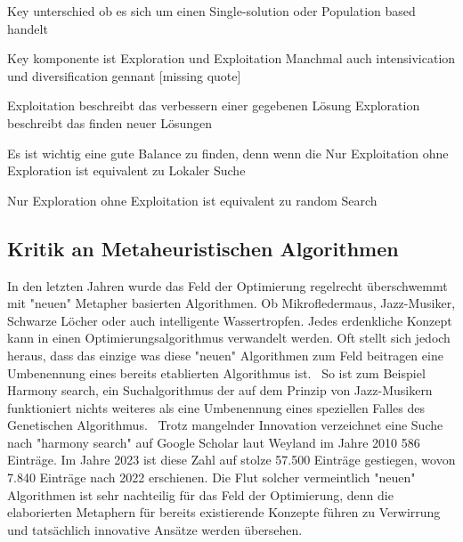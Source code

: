 Key unterschied ob es sich um einen Single-solution oder Population based handelt



Key komponente ist Exploration und Exploitation
Manchmal auch intensivication und diversification gennant [missing quote]

Exploitation beschreibt das verbessern einer gegebenen Lösung
Exploration beschreibt das finden neuer Lösungen

Es ist wichtig eine gute Balance zu finden, denn wenn die 
Nur Exploitation ohne Exploration ist equivalent zu Lokaler Suche

Nur Exploration ohne Exploitation ist equivalent zu random Search

\subsection{Kritik an Metaheuristischen Algorithmen}
In den letzten Jahren wurde das Feld der Optimierung regelrecht überschwemmt mit 
"neuen" Metapher basierten Algorithmen. Ob Mikrofledermaus, Jazz-Musiker, Schwarze Löcher
oder auch intelligente Wassertropfen. Jedes erdenkliche Konzept kann in einen 
Optimierungsalgorithmus verwandelt werden.
Oft stellt sich jedoch heraus, dass das einzige was diese "neuen" Algorithmen zum Feld beitragen
eine Umbenennung eines bereits etablierten Algorithmus ist.~\cite*{NoNovelty}
So ist zum Beispiel Harmony search, ein Suchalgorithmus der auf dem Prinzip von 
Jazz-Musikern funktioniert nichts weiteres als eine Umbenennung eines 
speziellen Falles des Genetischen Algorithmus.~\cite*{HarmonySearch}
Trotz mangelnder Innovation verzeichnet eine Suche nach "harmony search"
auf Google Scholar laut Weyland im Jahre 2010 586 Einträge. Im Jahre 2023 ist diese Zahl 
auf stolze 57.500 Einträge gestiegen, wovon 7.840 Einträge nach 2022 erschienen.
Die Flut solcher vermeintlich "neuen" Algorithmen ist sehr nachteilig für das 
Feld der Optimierung, denn die elaborierten Metaphern für bereits existierende Konzepte 
führen zu Verwirrung und tatsächlich innovative Ansätze werden übersehen.~\cite*{MetaheuristicsExposed}